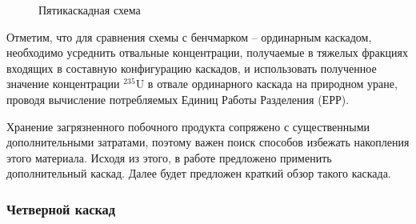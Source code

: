 \begin{figure}[ht]
  \caption{Пятикаскадная схема}\label{fig:Total scheme}
\end{figure}

Отметим, что для сравнения схемы с бенчмарком -- ординарным каскадом, необходимо усреднить отвальные концентрации, получаемые в тяжелых фракциях входящих в составную конфигурацию каскадов, и использовать полученное значение концентрации $^{235}$U в отвале ординарного каскада на природном уране, проводя вычисление потребляемых Единиц Работы Разделения (ЕРР).




Хранение загрязненного побочного продукта сопряжено с существенными дополнительными затратами, поэтому важен поиск способов избежать накопления этого материала.
Исходя из этого, в работе \cite{smirnovMethodEnrichReprocessed2019} предложено применить дополнительный каскад.
Далее будет предложен краткий обзор такого каскада.

\subsubsection{Четверной каскад}

